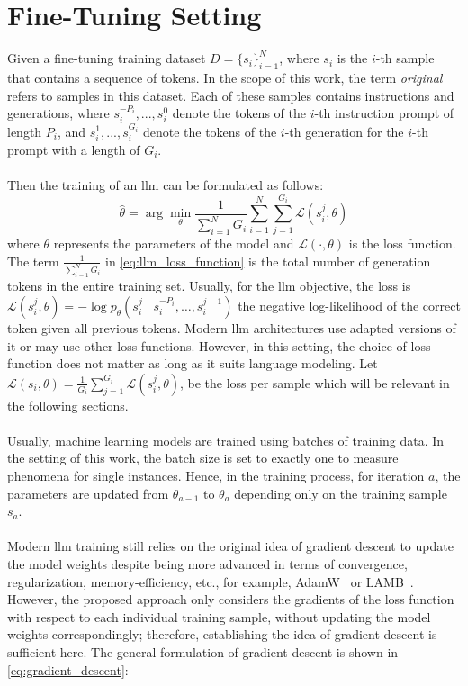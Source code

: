 \section{Fine-Tuning Setting}\label{sec:fine_tuning_setting}
Given a fine-tuning training dataset $D = \{s_i\}_{i=1}^N$, where $s_i$ is the $i$-th sample that contains a sequence of tokens. In the scope of this work, the term \emph{original} refers to samples in this dataset. Each of these samples contains instructions and generations, where $s_i^{-P_i},...,s_i^{0}$ denote the tokens of the $i$-th instruction prompt of length $P_i$, and $s_i^1,...,s_i^{G_i}$ denote the tokens of the $i$-th generation for the $i$-th prompt with a length of $G_i$.
\\\\
Then the training of an \acrshort{llm} can be formulated as follows: 
\begin{equation}
    \hat{\theta} = \arg\min_{\theta} \frac{1}{\sum_{i=1}^{N} G_i} \sum_{i=1}^{N} \sum_{j=1}^{G_i} \mathcal{L}(s_i^j, \theta)
    \label{eq:llm_loss_function}
\end{equation} 
where $\theta$ represents the parameters of the model and $\mathcal{L}(\cdot, \theta)$ is the loss function. The term $\frac{1}{\sum_{i=1}^{N} G_i}$ in \autoref{eq:llm_loss_function} is the total number of generation tokens in the entire training set. Usually, for the \acrshort{llm} objective, the loss is $\mathcal{L}(s_i^j, \theta) = -\log p_\theta(s_i^j \mid s_i^{-P_i}, \ldots, s_i^{j-1})$ the negative log-likelihood of the correct token given all previous tokens. Modern \acrshort{llm} architectures use adapted versions of it or may use other loss functions. However, in this setting, the choice of loss function does not matter as long as it suits language modeling. Let $\mathcal{L}(s_i, \theta) = \frac{1}{G_i} \sum_{j=1}^{G_i} \mathcal{L}(s_i^j, \theta)$, be the loss per sample which will be relevant in the following sections.
\\\\
Usually, machine learning models are trained using batches of training data. In the setting of this work, the batch size is set to exactly one to measure phenomena for single instances. Hence, in the training process, for iteration $a$, the parameters are updated from $\theta_{a-1}$ to $\theta_{a}$ depending only on the training sample $s_a$. 
\\\\
Modern \acrshort{llm} training still relies on the original idea of gradient descent to update the model weights despite being more advanced in terms of convergence, regularization, memory-efficiency, etc., for example, AdamW~\cite{DBLP:conf/iclr/LoshchilovH19} or LAMB~\cite{DBLP:conf/iclr/YouLRHKBSDKH20}. However, the proposed approach only considers the gradients of the loss function with respect to each individual training sample, without updating the model weights correspondingly; therefore, establishing the idea of gradient descent is sufficient here. The general formulation of gradient descent is shown in \autoref{eq:gradient_descent}:
